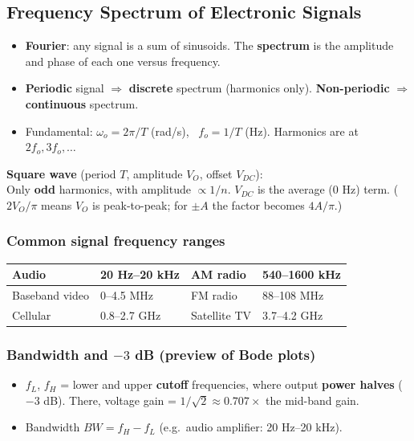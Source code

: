     \subsection[1.6]{Frequency Spectrum of Electronic Signals}
    \begin{itemize}
        \item \textbf{Fourier}: any signal is a sum of sinusoids. The \textbf{spectrum} is the amplitude and phase of each one versus frequency.
        \item \textbf{Periodic} signal $\Rightarrow$ \textbf{discrete} spectrum (harmonics only). \textbf{Non-periodic} $\Rightarrow$ \textbf{continuous} spectrum.
        \item Fundamental: $\omega_o = 2\pi/T$ (rad/s), \ $f_o = 1/T$ (Hz). Harmonics are at $2f_o, 3f_o, \dots$
    \end{itemize}
    \textbf{Square wave} (period $T$, amplitude $V_O$, offset $V_{DC}$):
    \\
    Only \textbf{odd} harmonics, with amplitude $\propto 1/n$. $V_{DC}$ is the average (0 Hz) term. ($2V_O/\pi$ means $V_O$ is peak-to-peak; for $\pm A$ the factor becomes $4A/\pi$.)

    \subsubsection{Common signal frequency ranges}
    \begin{tabularx}{\linewidth}{|L|l||L|l|}
        \hline
        Audio & 20 Hz--20 kHz & AM radio & 540--1600 kHz \\ \hline
        Baseband video & 0--4.5 MHz & FM radio & 88--108 MHz \\ \hline
        Cellular & 0.8--2.7 GHz & Satellite TV & 3.7--4.2 GHz \\ \hline
    \end{tabularx}

    \subsubsection{Bandwidth and $-3$ dB (preview of Bode plots)}
    \begin{itemize}
        \item $f_L$, $f_H$ = lower and upper \textbf{cutoff} frequencies, where output \textbf{power halves} ($-3$ dB). There, voltage gain = $1/\sqrt2 \approx 0.707\times$ the mid-band gain.
        \item Bandwidth $BW = f_H - f_L$ (e.g.\ audio amplifier: 20 Hz--20 kHz).
    \end{itemize}

